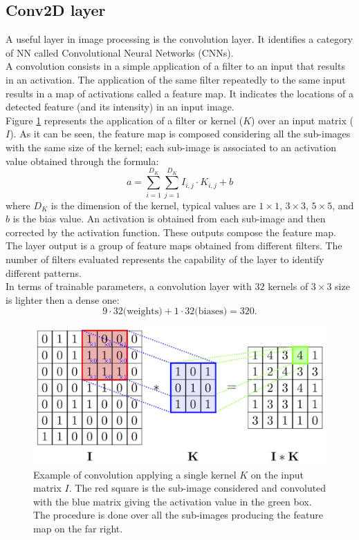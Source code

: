 \subsection*{Conv2D layer}
A useful layer in image processing is the convolution layer. It identifies a category of NN called Convolutional Neural Networks (CNNs).\\
A convolution consists in a simple application of a filter to an input that results in an activation. The application of the same filter repeatedly to the same input results in a map of activations called a feature map. It indicates the locations of a detected feature (and its intensity) in an input image.\\
Figure \ref{fig:Conv2D} represents the application of a filter or kernel ($K$) over an input matrix ($I$). As it can be seen, the feature map is composed considering all the sub-images with the same size of the kernel; each sub-image is associated to an activation value obtained through the formula:
\begin{equation}
    a = \sum_{i = 1}^{D_K}\sum_{j = 1}^{D_K} I_{i,j} \cdot K_{i,j} + b
\end{equation}
where $D_K$ is the dimension of the kernel, typical values are $1\times 1$, $3\times 3$, $5\times 5$, and $b$ is the bias value. An activation is obtained from each sub-image and then corrected by the activation function. These outputs compose the feature map.\\
The layer output is a group of feature maps obtained from different filters. The number of filters evaluated represents the capability of the layer to identify different patterns.\\

In terms of trainable parameters, a convolution layer with $32$ kernels of $3\times3$ size is lighter then a dense one:
\begin{equation*}
    9\cdot 32 \text{(weights)} + 1 \cdot 32 \text{(biases)} = 320.
\end{equation*}

\begin{figure}
	\centering
	\includegraphics[width=.6\textwidth]{IMG/Cap6/ConvScheme.png}
	\caption{Example of convolution applying a single kernel $K$ on the input matrix $I$. The red square is the sub-image considered and convoluted with the blue matrix giving the activation value in the green box. The procedure is done over all the sub-images producing the feature map on the far right.}
	\label{fig:Conv2D}
\end{figure}

